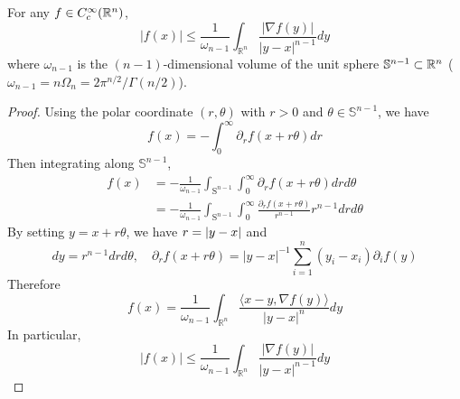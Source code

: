 \begin{prop}\label{prop:rieszineq}
	For any $f \in C_c^{\infty}(\mathbb{R}^n)$,
	\begin{equation*}
		|f(x)| \leq \frac{1}{\omega_{n-1}} \int_{\mathbb{R}^n} \frac{|\nabla f(y)|}{|y-x|^{n-1}} d y
	\end{equation*}
	where $\omega_{n-1}$ is the $(n-1)$-dimensional volume of the unit sphere $\mathbb{S}^{n-1} \subset \mathbb{R}^n$ ($\omega_{n-1}=n \Omega_n=2 \pi^{n / 2} / \Gamma(n / 2)$).
\end{prop}
\begin{proof}
	Using the polar coordinate $(r,\theta)$ with $r> 0$ and $\theta \in \mathbb{S}^{n-1}$, we have
	\begin{equation*}
		f(x)=-\int_0^{\infty} \partial_r f(x+r \theta) d r
	\end{equation*}
	Then integrating along $\mathbb{S}^{n-1}$,
	\begin{equation*}
		\begin{aligned}
			f(x) & =-\frac{1}{\omega_{n-1}} \int_{\mathrm{S}^{n-1}} \int_0^{\infty} \partial_r f(x+r \theta) d r d \theta \\
			& =-\frac{1}{\omega_{n-1}} \int_{\mathrm{S}^{n-1}} \int_0^{\infty} \frac{\partial_r f(x+r \theta)}{r^{n-1}} r^{n-1} d r d \theta
		\end{aligned}
	\end{equation*}
	By setting $y = x + r\theta$, we have $r = \left\lvert y-x\right\lvert$ and
	\begin{equation*}
		d y=r^{n-1} d r d \theta,\quad \partial_r f(x+r \theta)=|y-x|^{-1} \sum_{i=1}^n\left(y_i-x_i\right) \partial_i f(y)
	\end{equation*}
	Therefore
	\begin{equation*}
		f(x)=\frac{1}{\omega_{n-1}} \int_{\mathbb{R}^n} \frac{\langle x-y, \nabla f(y)\rangle}{|y-x|^n} d y
	\end{equation*}
	In particular,
	\begin{equation*}
		|f(x)| \leq \frac{1}{\omega_{n-1}} \int_{\mathbb{R}^n} \frac{|\nabla f(y)|}{|y-x|^{n-1}} d y
	\end{equation*}
\end{proof}

